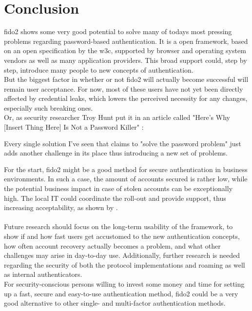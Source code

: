 
\section{Conclusion}
\label{sec:conclusion}

\ac{fido2} shows some very good potential to solve many of todays most pressing problems regarding password-based authentication. It is a open framework, based on an open specification by the \ac{w3c}, supported by browser and operating system vendors as well as many application providers. This broad support could, step by step, introduce many people to new concepts of authentication.\\
But the biggest factor in whether or not \ac{fido2} will actually become successful will remain user acceptance. For now, most of these users have not yet been directly affected by credential leaks, which lowers the perceived necessity for any changes, especially such breaking ones.\\
Or, as security researcher Troy Hunt put it in an article called "Here's Why [Insert Thing Here] Is Not a Password Killer" \cite{hunt2018a}:

\begin{displayquote}
    Every single solution I've seen that claims to "solve the password problem" just adds another challenge in its place thus introducing a new set of problems.
\end{displayquote}

\noindent For the start, \ac{fido2} might be a good method for secure authentication in business environments. In such a case, the amount of accounts secured is rather low, while the potential business impact in case of stolen accounts can be exceptionally high. The local IT could coordinate the roll-out and provide support, thus increasing acceptability, as shown by \cite{lang2017}.\\
\\
Future research should focus on the long-term usability of the framework, to show if and how fast users get accustomed to the new authentication concepts, how often account recovery actually becomes a problem, and what other challenges may arise in day-to-day use. Additionally, further research is needed regarding the security of both the protocol implementations and roaming as well as internal authenticators.\\

For security-conscious persons willing to invest some money and time for setting up a fast, secure and easy-to-use authentication method, \ac{fido2} could be a very good alternative to other single- and multi-factor authentication methods.